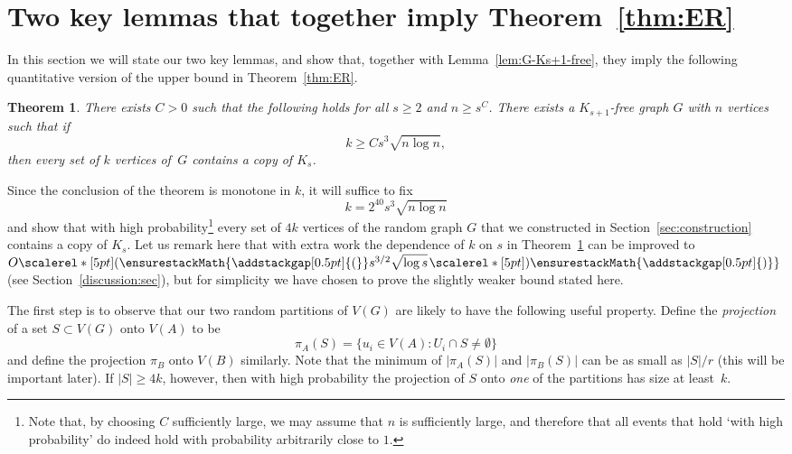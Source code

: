 \documentclass[12pt,reqno]{amsart}
\newcommand\pig[1]{\scalerel*[5pt]{\normalsize#1}{%
  \ensurestackMath{\addstackgap[0.5pt]{\normalsize#1}}}}
\newtheorem{theorem}{Theorem}
\theoremstyle{remark}
\numberwithin{theorem}{section}
\renewcommand{\(}{\bigl(}
\renewcommand{\)}{\bigr)\vphantom{)}}
\renewcommand{\ge}{\geqslant}
\begin{document}
\section{Two key lemmas that together imply Theorem~\ref{thm:ER}}\label{sec:three:lemmas}

In this section we will state our two key lemmas, and show that, together with Lemma~\ref{lem:G-Ks+1-free}, they imply the following quantitative version of the upper bound in Theorem~\ref{thm:ER}. 

\begin{theorem}\label{thm:ER:again}
There exists $C > 0$ such that the following holds for all $s \ge 2$ and $n \ge s^C$. There exists a $K_{s+1}$-free graph $G$ with $n$ vertices such that if
$$k \ge C s^3 \displaystyle{\sqrt{n\log n}},$$
then every set of $k$ vertices of $\,G$ contains a copy of $K_s$. 
\end{theorem}

Since the conclusion of the theorem is monotone in $k$, it will suffice to fix
\begin{equation}\label{def:k}
k = 2^{40} s^3 \sqrt{n \log n}
\end{equation}
and show that with high probability\footnote{Note that, by choosing $C$ sufficiently large, we may assume that $n$ is sufficiently large, and therefore that all events that hold `with high probability' do indeed hold with probability arbitrarily close to $1$.} every set of $4k$ vertices of the random graph $G$ that we constructed in Section~\ref{sec:construction} contains a copy of $K_s$. Let us remark here that with extra work the dependence of $k$ on $s$ in Theorem~\ref{thm:ER:again} can be improved to $O\pig( s^{3/2} \displaystyle{\sqrt{\log s}} \hspace{0.04cm} \pig)$ (see Section~\ref{discussion:sec}), but for simplicity we have chosen to prove the slightly weaker bound stated here. 

The first step is to observe that our two random partitions of $V(G)$ are likely to have the following useful property. Define the \emph{projection} of a set $S \subset V(G)$ onto $V(A)$ to be 
$$\pi_A(S) = \big\{ u_i \in V(A) : U_i \cap S \ne \emptyset \big\}$$ 
and define the projection $\pi_B$ onto $V(B)$ similarly. Note that the minimum of $|\pi_A(S)|$ and $|\pi_B(S)|$ can be as small as $|S|/r$ (this will be important later). %
If $|S| \ge 4k$, however, then with high probability the projection of $S$ onto \emph{one} of the partitions has size at least~$k$. 
\end{document}
